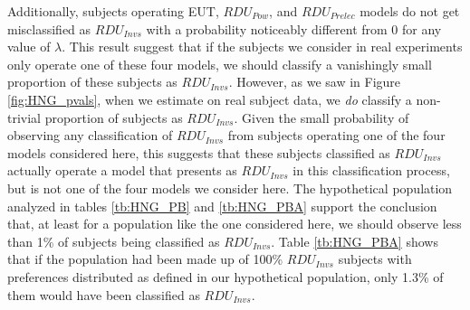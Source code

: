 \documentclass[../main.tex]{subfiles}
\begin{document}
Additionally, subjects operating EUT, $\mathit{RDU_{Pow}}$, and $\mathit{RDU_{Prelec}}$ models do not get misclassified as $\mathit{RDU_{Invs}}$ with a probability noticeably different from 0 for any value of $\lambda$.
This result suggest that if the subjects we consider in real experiments only operate one of these four models, we should classify a vanishingly small proportion of these subjects as $\mathit{RDU_{Invs}}$.
However, as we saw in Figure \ref{fig:HNG_pvals}, when we estimate on real subject data, we \textit{do} classify a non-trivial proportion of subjects as $\mathit{RDU_{Invs}}$.
Given the small probability of observing any classification of $\mathit{RDU_{Invs}}$ from subjects operating one of the four models considered here, this suggests that these subjects classified as $\mathit{RDU_{Invs}}$ actually operate a model that presents as $\mathit{RDU_{Invs}}$ in this classification process, but is not one of the four models we consider here.
The hypothetical population analyzed in tables \ref{tb:HNG_PB} and \ref{tb:HNG_PBA} support the conclusion that, at least for a population like the one considered here, we should observe less than 1\% of subjects being classified as $\mathit{RDU_{Invs}}$.
Table \ref{tb:HNG_PBA} shows that if the population had been made up of 100\% $\mathit{RDU_{Invs}}$ subjects with preferences distributed as defined in our hypothetical population, only 1.3\% of them would have been classified as $\mathit{RDU_{Invs}}$.



\newpage
\printbibliography[segment=3, heading=subbibliography]
\end{document}

